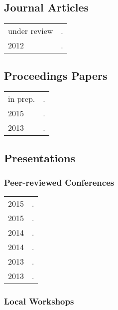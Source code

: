\documentclass[11pt,letterpaper,twoside]{article}
\makeatletter
\newenvironment{cvsection}{%
  \renewcommand{\arraystretch}{1.75}
  \begin{longtable}[l]{@{} L R @{}}
}{%
  \end{longtable}
}
\makeatother
\begin{document}
\subsection*{Journal Articles}

\begin{cvsection}
  under review & \null{}.\\

  2012 & \null{}.\\
\end{cvsection}

\subsection*{Proceedings Papers}

\begin{cvsection}
  in prep. & \null{}.\\

  2015 & \null{}.\\

  2013 & \null{}.\\
\end{cvsection}

\subsection*{Presentations}

\subsubsection*{Peer-reviewed Conferences}

\begin{cvsection}
  2015 & \null{}.\\
  2015 & \null{}.\\
  2014 & \null{}.\\
  2014 & \null{}.\\
  2013 & \null{}.\\
  2013 & \null{}.\\
\end{cvsection}

\subsubsection*{Local Workshops}
\end{document}
